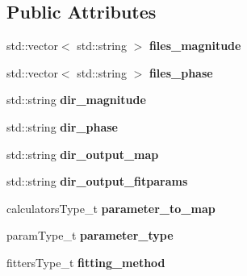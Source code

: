 \subsection*{Public Attributes}
\begin{DoxyCompactItemize}
\item 
\hypertarget{struct_ox_1_1_tomato_options_ad123055506ec1c4c73b397a5f771d2e7}{std\-::vector$<$ std\-::string $>$ {\bfseries files\-\_\-magnitude}}\label{struct_ox_1_1_tomato_options_ad123055506ec1c4c73b397a5f771d2e7}

\item 
\hypertarget{struct_ox_1_1_tomato_options_acd13f26343647d05164a33cb5b4163f3}{std\-::vector$<$ std\-::string $>$ {\bfseries files\-\_\-phase}}\label{struct_ox_1_1_tomato_options_acd13f26343647d05164a33cb5b4163f3}

\item 
\hypertarget{struct_ox_1_1_tomato_options_aeffcb3fc69397596ce852699a2f3b05d}{std\-::string {\bfseries dir\-\_\-magnitude}}\label{struct_ox_1_1_tomato_options_aeffcb3fc69397596ce852699a2f3b05d}

\item 
\hypertarget{struct_ox_1_1_tomato_options_a92cabcc150b94b5b4c3dbea6e8ecb846}{std\-::string {\bfseries dir\-\_\-phase}}\label{struct_ox_1_1_tomato_options_a92cabcc150b94b5b4c3dbea6e8ecb846}

\item 
\hypertarget{struct_ox_1_1_tomato_options_af31a50b6e23004912a1512812c823a29}{std\-::string {\bfseries dir\-\_\-output\-\_\-map}}\label{struct_ox_1_1_tomato_options_af31a50b6e23004912a1512812c823a29}

\item 
\hypertarget{struct_ox_1_1_tomato_options_ab8e2816968affd97a0ba0b13c44c4c02}{std\-::string {\bfseries dir\-\_\-output\-\_\-fitparams}}\label{struct_ox_1_1_tomato_options_ab8e2816968affd97a0ba0b13c44c4c02}

\item 
\hypertarget{struct_ox_1_1_tomato_options_a0d4ad4476a8817e68ead08d1b0645033}{calculators\-Type\-\_\-t {\bfseries parameter\-\_\-to\-\_\-map}}\label{struct_ox_1_1_tomato_options_a0d4ad4476a8817e68ead08d1b0645033}

\item 
\hypertarget{struct_ox_1_1_tomato_options_a943b1f0402f72d794bf21c62c3333f8b}{param\-Type\-\_\-t {\bfseries parameter\-\_\-type}}\label{struct_ox_1_1_tomato_options_a943b1f0402f72d794bf21c62c3333f8b}

\item 
\hypertarget{struct_ox_1_1_tomato_options_a2d1d2149185ef71968980cf8c6afcf14}{fitters\-Type\-\_\-t {\bfseries fitting\-\_\-method}}\label{struct_ox_1_1_tomato_options_a2d1d2149185ef71968980cf8c6afcf14}


\end{DoxyCompactItemize}
